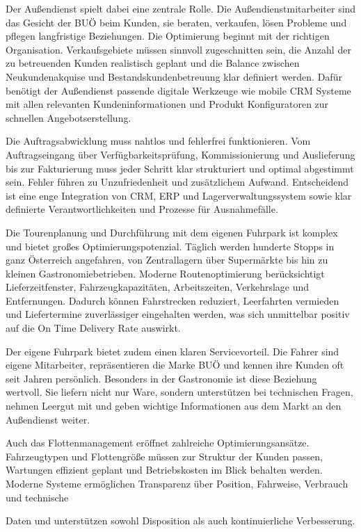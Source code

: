 Der Außendienst spielt dabei eine zentrale Rolle. Die Außendienstmitarbeiter sind das Gesicht der BUÖ beim Kunden, sie beraten, verkaufen, lösen Probleme und pflegen langfristige Beziehungen. Die Optimierung beginnt mit der richtigen Organisation. Verkaufsgebiete müssen sinnvoll zugeschnitten sein, die Anzahl der zu betreuenden Kunden realistisch geplant und die Balance zwischen Neukundenakquise und Bestandskundenbetreuung klar definiert werden. Dafür benötigt der Außendienst passende digitale Werkzeuge wie mobile CRM Systeme mit allen relevanten Kundeninformationen und Produkt Konfiguratoren zur schnellen Angebotserstellung.  

Die Auftragsabwicklung muss nahtlos und fehlerfrei funktionieren. Vom Auftragseingang über Verfügbarkeitsprüfung, Kommissionierung und Auslieferung bis zur Fakturierung muss jeder Schritt klar strukturiert und optimal abgestimmt sein. Fehler führen zu Unzufriedenheit und zusätzlichem Aufwand. Entscheidend ist eine enge Integration von CRM, ERP und Lagerverwaltungssystem sowie klar definierte Verantwortlichkeiten und Prozesse für Ausnahmefälle.  

Die Tourenplanung und Durchführung mit dem eigenen Fuhrpark ist komplex und bietet großes Optimierungspotenzial. Täglich werden hunderte Stopps in ganz Österreich angefahren, von Zentrallagern über Supermärkte bis hin zu kleinen Gastronomiebetrieben. Moderne Routenoptimierung berücksichtigt Lieferzeitfenster, Fahrzeugkapazitäten, Arbeitszeiten, Verkehrslage und Entfernungen. Dadurch können Fahrstrecken reduziert, Leerfahrten vermieden und Liefertermine zuverlässiger eingehalten werden, was sich unmittelbar positiv auf die On Time Delivery Rate auswirkt.  

Der eigene Fuhrpark bietet zudem einen klaren Servicevorteil. Die Fahrer sind eigene Mitarbeiter, repräsentieren die Marke BUÖ und kennen ihre Kunden oft seit Jahren persönlich. Besonders in der Gastronomie ist diese Beziehung wertvoll. Sie liefern nicht nur Ware, sondern unterstützen bei technischen Fragen, nehmen Leergut mit und geben wichtige Informationen aus dem Markt an den Außendienst weiter.  

Auch das Flottenmanagement eröffnet zahlreiche Optimierungsansätze. Fahrzeugtypen und Flottengröße müssen zur Struktur der Kunden passen, Wartungen effizient geplant und Betriebskosten im Blick behalten werden. Moderne Systeme ermöglichen Transparenz über Position, Fahrweise, Verbrauch und technische  

Daten und unterstützen sowohl Disposition als auch kontinuierliche Verbesserung.  

